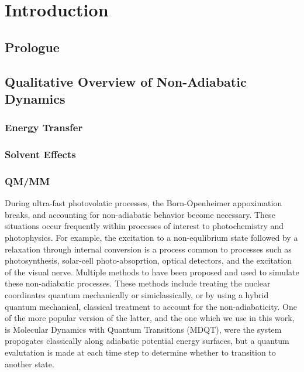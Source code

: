 \chapter{Introduction} \label{introduction}

\section{Prologue}

\section{Qualitative Overview of Non-Adiabatic Dynamics}

\subsection{Energy Transfer}

\subsection{Solvent Effects}

\subsection{QM/MM}

During ultra-fast photovolatic processes, the Born-Openheimer
appoximation breaks, and accounting for non-adiabatic behavior become
necessary.  These situations occur frequently within processes of
interest to photochemistry and photophysics.  For example, the
excitation to a non-equlibrium state followed by a relaxation through
internal conversion is a process common to processes such as
photosynthesis, solar-cell photo-absoprtion, optical detectors, and
the excitation of the visual nerve.  Multiple methods to have been
proposed and used to simulate these non-adiabatic processes.  These
methods include treating the nuclear coordinates quantum mechanically
or simiclassically, or by using a hybrid quantum mechanical, classical
treatment to account for the non-adiabaticity.  One of the more
popular version of the latter, and the one which we use in this work,
is Molecular Dynamics with Quantum Transitions (MDQT), were the system
propogates classically along adiabatic potential energy surfaces, but
a quantum evalutation is made at each time step to determine whether
to transition to another state.

